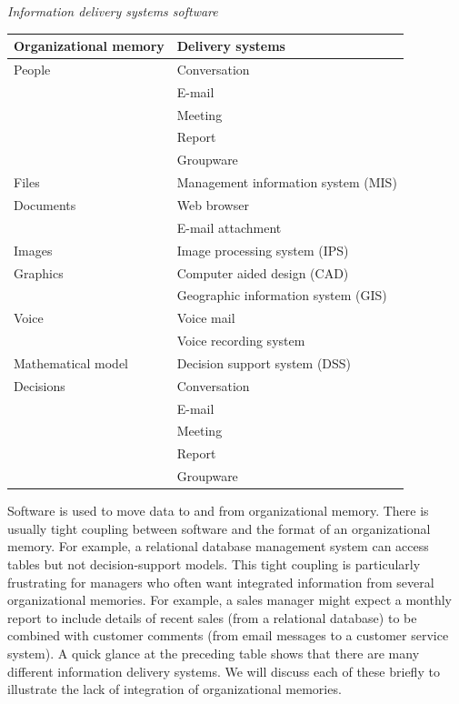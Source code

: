 \documentclass[
]{article}
\begin{document}
\emph{Information delivery systems software}

\begin{longtable}[]{@{}
  >{\raggedright\arraybackslash}p{}
  >{\raggedright\arraybackslash}p{}@{}}
\toprule
Organizational memory & Delivery systems \\
\midrule
\endhead
People & Conversation \\
& E-mail \\
& Meeting \\
& Report \\
& Groupware \\
Files & Management information system (MIS) \\
Documents & Web browser \\
& E-mail attachment \\
Images & Image processing system (IPS) \\
Graphics & Computer aided design (CAD) \\
& Geographic information system (GIS) \\
Voice & Voice mail \\
& Voice recording system \\
Mathematical model & Decision support system (DSS) \\
Decisions & Conversation \\
& E-mail \\
& Meeting \\
& Report \\
& Groupware \\
\bottomrule
\end{longtable}

Software is used to move data to and from organizational memory. There
is usually tight coupling between software and the format of an
organizational memory. For example, a relational database management
system can access tables but not decision-support models. This tight
coupling is particularly frustrating for managers who often want
integrated information from several organizational memories. For
example, a sales manager might expect a monthly report to include
details of recent sales (from a relational database) to be combined with
customer comments (from email messages to a customer service system). A
quick glance at the preceding table shows that there are many different
information delivery systems. We will discuss each of these briefly to
illustrate the lack of integration of organizational memories.
\end{document}

